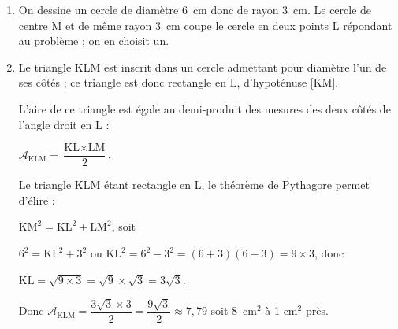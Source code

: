 
\medskip

%
%

\begin{enumerate}
\item %
On dessine un cercle de diamètre 6~cm donc de rayon 3~cm. Le cercle de centre M et de même rayon 3~cm coupe le cercle en deux points L répondant au problème ; on en choisit un.
\item %
Le triangle KLM est inscrit dans un cercle admettant pour diamètre l'un de ses côtés ; ce triangle est donc rectangle en L, d'hypoténuse [KM].

L'aire de ce triangle est égale au demi-produit des mesures des deux côtés de l'angle droit en L :

$\mathcal{A}_{\text{KLM}} = \dfrac{\text{KL} \times \text{LM} }{2}$.

Le triangle KLM étant rectangle en L, le théorème de Pythagore permet d'élire :

$\text{KM}^2 = \text{KL}^2 + \text{LM}^2$, soit 

$6^2 = \text{KL}^2 + 3^2$ ou $\text{KL}^2 = 6^2 - 3^2 = (6 + 3)(6 - 3) = 9 \times 3$, donc 

$\text{KL} = \sqrt{9 \times 3} = \sqrt{9} \times \sqrt{3} = 3\sqrt{3}$.

Donc $\mathcal{A}_{\text{KLM}} = \dfrac{3\sqrt{3} \times 3 }{2} = \dfrac{9\sqrt{3}}{2} \approx 7,79$ soit 8~cm$^2$ à 1 cm$^2$ près.
\end{enumerate}

\vspace{0,5cm}


